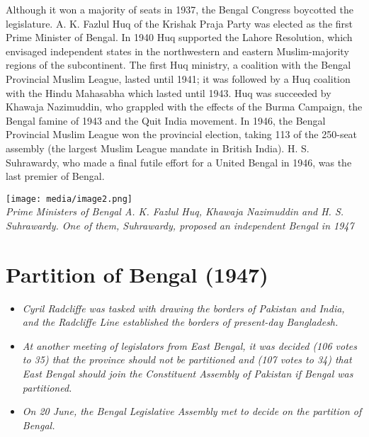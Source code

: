 Although it won a majority of seats in 1937, the Bengal Congress
boycotted the legislature. A. K. Fazlul Huq of the Krishak Praja Party
was elected as the first Prime Minister of Bengal. In 1940 Huq supported
the Lahore Resolution, which envisaged independent states in the
northwestern and eastern Muslim-majority regions of the subcontinent.
The first Huq ministry, a coalition with the Bengal Provincial Muslim
League, lasted until 1941; it was followed by a Huq coalition with the
Hindu Mahasabha which lasted until 1943. Huq was succeeded by Khawaja
Nazimuddin, who grappled with the effects of the Burma Campaign, the
Bengal famine of 1943 and the Quit India movement. In 1946, the Bengal
Provincial Muslim League won the provincial election, taking 113 of the
250-seat assembly (the largest Muslim League mandate in British India).
H. S. Suhrawardy, who made a final futile effort for a United Bengal in
1946, was the last premier of Bengal.

\texttt{[image: media/image2.png]}\\
\emph{Prime Ministers of Bengal A. K. Fazlul Huq, Khawaja Nazimuddin and
H. S. Suhrawardy. One of them, Suhrawardy, proposed an independent
Bengal in 1947}

\section{Partition of Bengal (1947)}\label{partition-of-bengal-1947}

\begin{itemize}
\item
  \emph{Cyril Radcliffe was tasked with drawing the borders of Pakistan
  and India, and the Radcliffe Line established the borders of
  present-day Bangladesh.}
\item
  \emph{At another meeting of legislators from East Bengal, it was
  decided (106 votes to 35) that the province should not be partitioned
  and (107 votes to 34) that East Bengal should join the Constituent
  Assembly of Pakistan if Bengal was partitioned.}
\item
  \emph{On 20 June, the Bengal Legislative Assembly met to decide on the
  partition of Bengal.}
\end{itemize}

